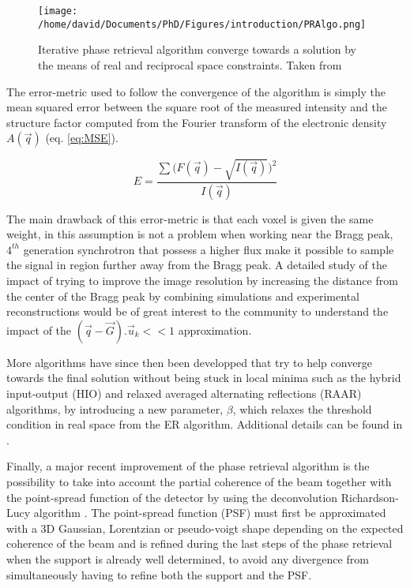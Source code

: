 \begin{figure}[!htb]
   \centering
   \texttt{[image: /home/david/Documents/PhD/Figures/introduction/PRAlgo.png]}
   \caption{
   Iterative phase retrieval algorithm converge towards a solution by the means of real and reciprocal space constraints.
   Taken from \cite{Willmott}
   }
   \label{fig:PRAlgo}
\end{figure}

The error-metric used to follow the convergence of the algorithm is simply the mean squared error between the square root of the measured intensity and the structure factor computed from the Fourier transform of the electronic density $A(\vec{q})$ (eq. \ref{eq:MSE}).

\begin{equation}
    \label{eq:MSE}
    E = \frac{\sum \big( F(\vec{q}) - \sqrt{I(\vec{q})}  \big)^2}{I(\vec{q})}
\end{equation}

The main drawback of this error-metric is that each voxel is given the same weight, in this assumption is not a problem when working near the Bragg peak, $4^{th}$ generation synchrotron that possess a higher flux make it possible to sample the signal in region further away from the Bragg peak.
A detailed study of the impact of trying to improve the image resolution by increasing the distance from the center of the Bragg peak by combining simulations and experimental reconstructions would be of great interest to the community to understand the impact of the $(\vec{q}-\vec{G}).\vec{u}_k<<1$ approximation.

More algorithms have since then been developped that try to help converge towards the final solution without being stuck in local minima such as the hybrid input-output (HIO) and relaxed averaged alternating reflections (RAAR) algorithms, by introducing a new parameter, $\beta$, which relaxes the threshold condition in real space from the ER algorithm.
Additional details can be found in \cite{Marchesini2003,Luke2005,Marchesini2007}.

Finally, a major recent improvement of the phase retrieval algorithm is the possibility to take into account the partial coherence of the beam together with the point-spread function of the detector by using the deconvolution Richardson-Lucy algorithm \parencite{Richardson1972, LucyAlgo1974, Fish1995, Clark2012}.
The point-spread function (PSF) must first be approximated with a 3D Gaussian, Lorentzian or pseudo-voigt shape depending on the expected coherence of the beam and is refined during the last steps of the phase retrieval when the support is already well determined, to avoid any divergence from simultaneously having to refine both the support and the PSF.

